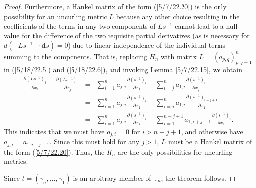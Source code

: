 \documentclass{amsart}
\numberwithin{equation}{section}
\theoremstyle{definition}
\numberwithin{theorem}{section}
\begin{document}
\begin{proof}
Furthermore, a Hankel matrix of the form (\ref{5/7/22.20}) is the only possibility for an uncurling metric $L$ because any other choice resulting in the coefficients of the terms in any two components of $Ls^{-1}$ cannot lead to a null value for the difference of the two requisite partial derivatives (as is necessary for $d\left([L s^{-1}]\cdot \mathbf{d}s\right) = 0$) due to linear independence of the individual terms summing to the components. That is, replacing  $H_n$ with matrix $L=(a_{p,q})_{p,q=1}^n$ in (\ref{5/18/22.5}) 
and (\ref{5/18/22.6}), and invoking Lemma \ref{5/7/22.15}, we obtain
\begin{eqnarray}\nonumber \frac{\partial \left(L s^{-1}\right)_j}{\partial x_1}  -  \frac{\partial \left(L s^{-1}\right)_1}{\partial x_j} &=&  \sum_{i=1}^n a_{j,i}\frac{\partial \left(s^{-1}\right)_i}{\partial x_1} - \sum_{i=j}^n a_{1,i}\frac{\partial \left(s^{-1}\right)_i}{\partial x_j} \\  &=& \sum_{i=1}^n a_{j,i}\frac{\partial \left(s^{-1}\right)_i}{\partial x_1} - \sum_{i=j}^n a_{1,i}\frac{\partial \left(s^{-1}\right)_{i-j+1}}{\partial x_1} \nonumber \\
&=& \sum_{i=1}^n a_{j,i}\frac{\partial \left(s^{-1}\right)_i}{\partial x_1} - \sum_{i=1}^{n-j+1} a_{1,i+j-1}\frac{\partial \left(s^{-1}\right)_i}{\partial x_1}.
\label{5/9/22.10}
\end{eqnarray}
This indicates that we must have $a_{j,i}=0$ for $i>n-j+1$, and otherwise have $a_{j,i} = a_{1,i+j-1}$.  Since this must hold for any $j>1$, $L$ must be a Hankel matrix of the form (\ref{5/7/22.20}).  Thus, the $H_n$ are the only possibilities for uncurling metrics. 

Since $t=(\gamma_n,\dots,\gamma_1)$ is an arbitrary member of $\mathbb{T}_n$, the theorem follows.
\end{proof}
\end{document}
